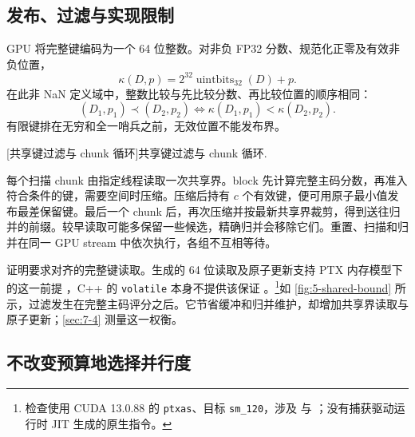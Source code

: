 \subsection{发布、过滤与实现限制}

GPU 将完整键编码为一个 64 位整数。对非负 FP32 分数、规范化正零及有效非负位置，
\begin{equation}
 \kappa(D,p)=2^{32}\operatorname{uintbits}_{32}(D)+p.
 \label{eq:5-packed-key}
\end{equation}
在此非 NaN 定义域中，整数比较与先比较分数、再比较位置的顺序相同：
\[
 (D_1,p_1)\prec(D_2,p_2)\iff\kappa(D_1,p_1)<\kappa(D_2,p_2).
\]
有限键排在无穷和全一哨兵之前，无效位置不能发布界。

\par\medskip\noindent\begin{minipage}{\linewidth}
\captionsetup{hypcap=false}
\centering

[共享键过滤与 chunk 循环]{共享键过滤与 chunk 循环.}
\label{fig:5-shared-bound}
\end{minipage}\par\medskip
每个扫描 chunk 由指定线程读取一次共享界。block 先计算完整主码分数，再准入符合条件的键，需要空间时压缩。压缩后持有 $c$ 个有效键，便可用原子最小值发布最差保留键。最后一个 chunk 后，再次压缩并按最新共享界裁剪，得到送往归并的前缀。较早读取可能多保留一些候选，精确归并会移除它们。重置、扫描和归并在同一 GPU stream 中依次执行，各组不互相等待。

证明要求对齐的完整键读取。生成的 64 位读取及原子更新支持 PTX 内存模型下的这一前提 \cite{ptx_isa}，C++ 的 \texttt{volatile} 本身不提供该保证 \cite{cuda_programming_guide}。\footnote{检查使用 CUDA 13.0.88 的 \texttt{ptxas}、目标 \texttt{sm\_120}，涉及  与 ；没有捕获驱动运行时 JIT 生成的原生指令。}如 \cref{fig:5-shared-bound} 所示，过滤发生在完整主码评分之后。它节省缓冲和归并维护，却增加共享界读取与原子更新；\cref{sec:7-4} 测量这一权衡。

\subsection{不改变预算地选择并行度}

